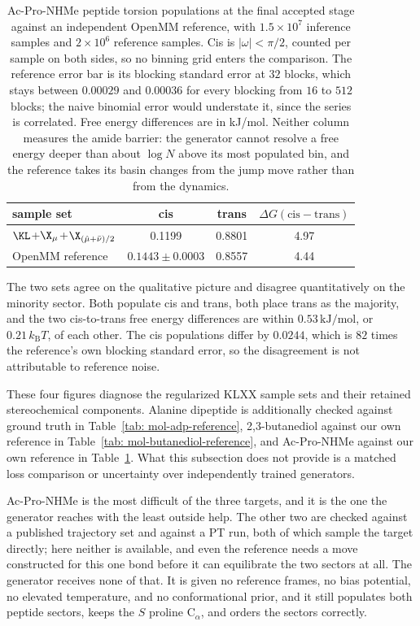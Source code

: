 \documentclass{article}
\begin{document}
\begin{table}[htb]
\centering
\small
\begin{tabular}{lccc}
\toprule
sample set & cis & trans & \(\Delta G(\mathrm{cis}-\mathrm{trans})\) \\
\midrule
$\KL$+$\X_\mu$+$\X_{(\hat\mu+\bar\nu)/2}$ & 0.1199 & 0.8801 & 4.97 \\
OpenMM reference & \(0.1443\pm0.0003\) & 0.8557 & 4.44 \\
\bottomrule
\end{tabular}
\caption{Ac-Pro-NHMe peptide torsion populations at the final accepted stage against an independent OpenMM reference, with \(1.5\times10^7\) inference samples and \(2\times10^6\) reference samples. Cis is \(|\omega|<\pi/2\), counted per sample on both sides, so no binning grid enters the comparison. The reference error bar is its blocking standard error at \(32\) blocks, which stays between \(0.00029\) and \(0.00036\) for every blocking from \(16\) to \(512\) blocks; the naive binomial error would understate it, since the series is correlated. Free energy differences are in kJ/mol. Neither column measures the amide barrier: the generator cannot resolve a free energy deeper than about \(\log N\) above its most populated bin, and the reference takes its basin changes from the jump move rather than from the dynamics.}
\label{tab: mol-ac-pro-reference}
\end{table}

The two sets agree on the qualitative picture and disagree quantitatively on the minority sector. Both populate cis and trans, both place trans as the majority, and the two cis-to-trans free energy differences are within \(0.53\,\mathrm{kJ/mol}\), or \(0.21\,k_{\mathrm B}T\), of each other. The cis populations differ by \(0.0244\), which is \(82\) times the reference's own blocking standard error, so the disagreement is not attributable to reference noise.

These four figures diagnose the regularized KLXX sample sets and their retained stereochemical components. Alanine dipeptide is additionally checked against ground truth in Table~\ref{tab: mol-adp-reference}, 2,3-butanediol against our own reference in Table~\ref{tab: mol-butanediol-reference}, and Ac-Pro-NHMe against our own reference in Table~\ref{tab: mol-ac-pro-reference}. What this subsection does not provide is a matched loss comparison or uncertainty over independently trained generators.

Ac-Pro-NHMe is the most difficult of the three targets, and it is the one the generator reaches with the least outside help. The other two are checked against a published trajectory set and against a PT run, both of which sample the target directly; here neither is available, and even the reference needs a move constructed for this one bond before it can equilibrate the two sectors at all. The generator receives none of that. It is given no reference frames, no bias potential, no elevated temperature, and no conformational prior, and it still populates both peptide sectors, keeps the \(S\) proline \(\mathrm C_\alpha\), and orders the sectors correctly.
\end{document}
